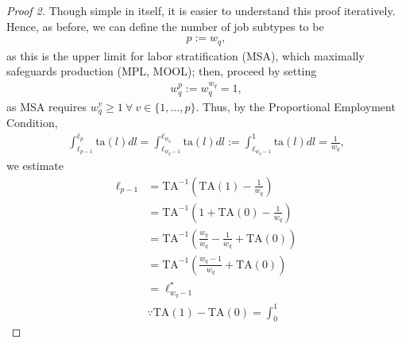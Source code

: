 \documentclass[hidelinks, nonatbib]{elsarticle}
\begin{document}
\begin{lemma}
    \begin{proof}[Proof 2]
        Though simple in itself, it is easier to understand this proof iteratively. Hence, as before, we can define the number of job subtypes to be
        \begin{gather}
            p := w_q
            ,
        \end{gather}
        as this is the upper limit for labor stratification (MSA), which maximally safeguards production (MPL, MOOL); then, proceed by setting
        \begin{gather}
        w_{q}^{p} 
        := 
        w_{q}^{w_q} 
        = 
        1
        ,
        \end{gather}
        as MSA requires $w_{q}^{v} \geq 1 \ \forall \ v \in \{1, \dots, p\}$. Thus, by the Proportional Employment Condition, 
        \begin{gather}
        \int_{
            \ell_{p-1}
        }^{
            \ell_{p}
        }{
            \text{ta}(l)dl
        }
        =
        \int_{
            \ell_{w_q-1}
        }^{
            \ell_{w_q}
        }{
            \text{ta}(l)dl
        }
        :=
        \int_{
            \ell_{w_q-1}
        }^{1}{
            \text{ta}(l)dl
        }
        =
        \frac{1}{w_q}
        ,
        \end{gather}
        we estimate
        \begin{align}
            \ell_{p - 1}
            &=
            \text{TA}^{-1}\left(
                \text{TA}(1)
                -
                \frac{1}{w_q}
                \right)
            \\
            &=
            \text{TA}^{-1}\left(
                1
                +
                \text{TA}(0)
                -
                \frac{1}{w_q}
            \right)
            \\
            &=
            \text{TA}^{-1}\left(
                \frac{w_q}{w_q}
                -
                \frac{1}{w_q}
                +
                \text{TA}(0)
            \right)
            \\
            &=
            \text{TA}^{-1}\left(
                \frac{w_q - 1}{w_q}
                +
                \text{TA}(0)
            \right)
            \\
            &=
            \ell_{w_q - 1}^{*}
            \\
            &\because
            \text{TA}(1)
            -
            \text{TA}(0)
            =
            \int_{0}^{1}{
}
\end{align}
\end{proof}
\end{lemma}
\end{document}
